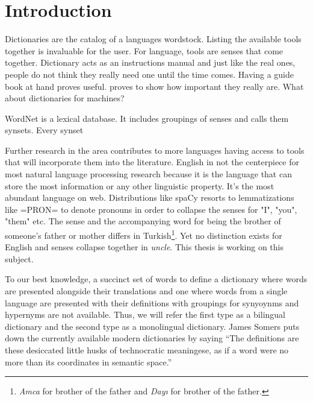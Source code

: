 
\chapter{Introduction}\label{chap:introduction}%
Dictionaries are the catalog of a languages wordstock.
Listing the available tools together is invaluable for the user.
For language, tools are senses that come together.
Dictionary acts as an instructions manual and just like the real ones, people do not think they really need one until the time comes.
Having a guide book at hand proves useful.
proves to show how important they really are.
What about dictionaries for machines?

WordNet is a lexical database.
It includes groupings of senses and calls them synsets.
Every synset

Further research in the area contributes to more languages having access to tools that will incorporate them into the literature.
English in not the centerpiece for most natural language processing research because it is the language that can store the most information or any other linguistic property.
It's the most abundant language on web.
Distributions like spaCy resorts to lemmatizations like =PRON= to denote pronouns in order to collapse the senses for "I", "you", "them" etc\@.
The sense and the accompanying word for being the brother of someone's father or mother differs in Turkish\footnote{\emph{Amca} for brother of the father and \emph{Dayı} for brother of the father.}.
Yet no distinction exists for English and senses collapse together in \emph{uncle}.
This thesis is working on this subject.


To our best knowledge, a succinct set of words to define a dictionary where words are presented alongside their translations and one where words from a single language are presented with their definitions with groupings for synyoynms and hypernyms are not available.
Thus, we will refer the first type as a bilingual dictionary and the second type as a monolingual dictionary.
James Somers puts down the currently available modern dictionaries by saying \enquote{The definitions are these desiccated little husks of technocratic meaningese, as if a word were no more than its coordinates in semantic space.}\cite{noauthor_youre_nodate}

